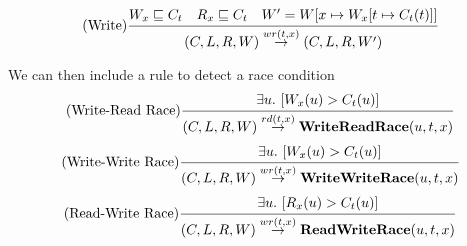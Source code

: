 \[(\text{Write})\cfrac{W_x \sqsubseteq C_t \quad R_x \sqsubseteq C_t \quad W' = W[x \mapsto W_x[t \mapsto C_t(t)]]}{(C,L,R,W) \overset{wr(t,x)}{\to} (C,L,R,W')}\]

We can then include a rule to detect a race condition
\[(\text{Write-Read Race})\cfrac{\exists u . \ [W_x(u) > C_t(u)]}{(C,L,R,W) \overset{rd(t,x)}{\to} \mathbf{WriteReadRace}(u,t,x)}\]
\[(\text{Write-Write Race})\cfrac{\exists u . \ [W_x(u) > C_t(u)]}{(C,L,R,W) \overset{wr(t,x)}{\to} \mathbf{WriteWriteRace}(u,t,x)}\]
\[(\text{Read-Write Race})\cfrac{\exists u . \ [R_x(u) > C_t(u)]}{(C,L,R,W) \overset{wr(t,x)}{\to} \mathbf{ReadWriteRace}(u,t,x)}\]

\unfinished
